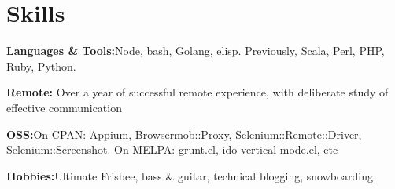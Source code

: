 \section{Skills}
%
\begin{position}
\item[] \textbf{Languages \& Tools:}\quad Node, bash, Golang, elisp. Previously, Scala, Perl, PHP, Ruby, Python.
\item[] \textbf{Remote:} Over a year of successful remote experience, with deliberate study of effective communication
\item[] \textbf{OSS:}\quad On CPAN: Appium, Browsermob::Proxy, Selenium::Remote::Driver, Selenium::Screenshot. On MELPA: grunt.el, ido-vertical-mode.el, etc
\item[] \textbf{Hobbies:}\quad Ultimate Frisbee, bass \& guitar, technical blogging, snowboarding
\end{position}
